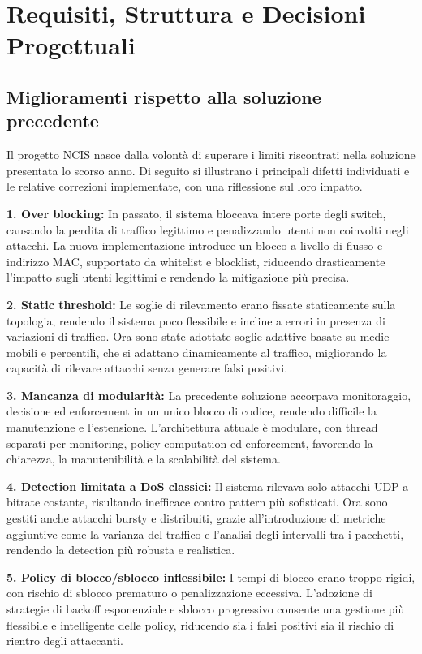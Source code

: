 \chapter{Requisiti, Struttura e Decisioni Progettuali}

\section{Miglioramenti rispetto alla soluzione precedente}
Il progetto NCIS nasce dalla volontà di superare i limiti riscontrati nella soluzione presentata lo scorso anno. Di seguito si illustrano i principali difetti individuati e le relative correzioni implementate, con una riflessione sul loro impatto.

\textbf{1. Over blocking:} In passato, il sistema bloccava intere porte degli switch, causando la perdita di traffico legittimo e penalizzando utenti non coinvolti negli attacchi. La nuova implementazione introduce un blocco a livello di flusso e indirizzo MAC, supportato da whitelist e blocklist, riducendo drasticamente l'impatto sugli utenti legittimi e rendendo la mitigazione più precisa.

\textbf{2. Static threshold:} Le soglie di rilevamento erano fissate staticamente sulla topologia, rendendo il sistema poco flessibile e incline a errori in presenza di variazioni di traffico. Ora sono state adottate soglie adattive basate su medie mobili e percentili, che si adattano dinamicamente al traffico, migliorando la capacità di rilevare attacchi senza generare falsi positivi.

\textbf{3. Mancanza di modularità:} La precedente soluzione accorpava monitoraggio, decisione ed enforcement in un unico blocco di codice, rendendo difficile la manutenzione e l'estensione. L'architettura attuale è modulare, con thread separati per monitoring, policy computation ed enforcement, favorendo la chiarezza, la manutenibilità e la scalabilità del sistema.

\textbf{4. Detection limitata a DoS classici:} Il sistema rilevava solo attacchi UDP a bitrate costante, risultando inefficace contro pattern più sofisticati. Ora sono gestiti anche attacchi bursty e distribuiti, grazie all'introduzione di metriche aggiuntive come la varianza del traffico e l'analisi degli intervalli tra i pacchetti, rendendo la detection più robusta e realistica.

\textbf{5. Policy di blocco/sblocco inflessibile:} I tempi di blocco erano troppo rigidi, con rischio di sblocco prematuro o penalizzazione eccessiva. L'adozione di strategie di backoff esponenziale e sblocco progressivo consente una gestione più flessibile e intelligente delle policy, riducendo sia i falsi positivi sia il rischio di rientro degli attaccanti.

